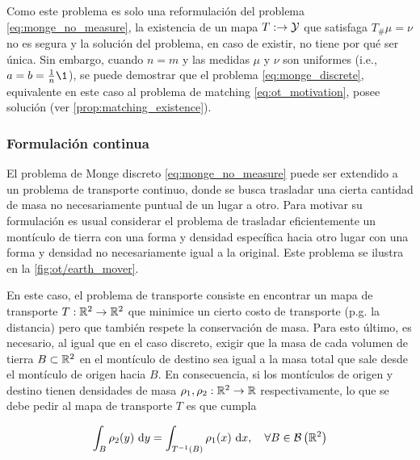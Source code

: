 Como este problema es solo una reformulación del problema \eqref{eq:monge_no_measure}, la existencia de un mapa $T:\to\mathcal{Y}$ que satisfaga $T_\#\mu = \nu$ no es segura y la solución del problema, en caso de existir, no tiene por qué ser única. Sin embargo, cuando $n=m$ y las medidas $\mu$ y $\nu$ son uniformes (i.e., $a=b=\frac{1}{n}\1$), se puede demostrar que el problema \eqref{eq:monge_discrete}, equivalente en este caso al problema de matching \eqref{eq:ot_motivation}, posee solución (ver \autoref{prop:matching_existence}).

\subsubsection{Formulación continua}

El problema de Monge discreto \eqref{eq:monge_no_measure} puede ser extendido a un problema de transporte continuo, donde se busca trasladar una cierta cantidad de masa no necesariamente puntual de un lugar a otro. Para motivar su formulación es usual considerar el problema de trasladar eficientemente un montículo de tierra con una forma y densidad específica hacia otro lugar con una forma y densidad no necesariamente igual a la original. Este problema se ilustra en la \autoref{fig:ot/earth_mover}.


En este caso, el problema de transporte consiste en encontrar un mapa de transporte $T:\mathbb{R}^2\to\mathbb{R}^2$ que minimice un cierto costo de transporte (p.g. la distancia) pero que también respete la conservación de masa. Para esto último, es necesario, al igual que en el caso discreto, exigir que la masa de cada volumen de tierra $B\subset\mathbb{R}^2$ en el montículo de destino sea igual a la masa total que sale desde el montículo de origen hacia $B$. En consecuencia, si los montículos de origen y destino tienen densidades de masa $\rho_1,\rho_2:\mathbb{R}^2\to\mathbb{R}$ respectivamente, lo que se debe pedir al mapa de transporte $T$ es que cumpla

\begin{equation}
	\int_{B} \rho_2(y) \,\operatorname{d}\! y = \int_{T^{-1}(B)} \rho_1(x) \,\operatorname{d}\! x,
	\quad\forall B\in\mathcal{B}\left(\mathbb{R}^2\right)
	\label{eq:push_forward_r2}
\end{equation}

